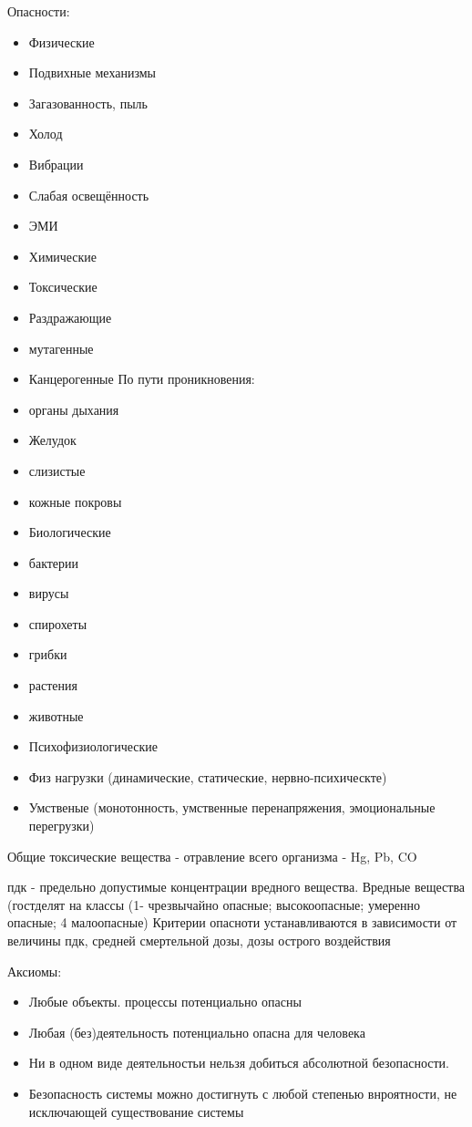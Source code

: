 \documentclass[a4paper,12pt]{report}
\begin{document}
	Опасности:
	\begin{itemize}
	\item	Физические
		\item	Подвихные механизмы
		\item	Загазованность, пыль
		\item	Холод
		\item	Вибрации
		\item	Слабая освещённость 
		\item	ЭМИ
	\item	Химические
		\item	Токсические
		\item	Раздражающие
		\item	мутагенные 
		\item	Канцерогенные
		По пути проникновения: 
		\item	органы дыхания
		\item	Желудок
		\item	слизистые
		\item	кожные покровы
	\item	Биологические
		\item	бактерии
		\item	вирусы
		\item	спирохеты
		\item	грибки
		\item	растения
		\item	животные
	\item	Психофизиологические
		\item	Физ нагрузки (динамические, статические, нервно-психическте)
		\item	Умственые (монотонность, умственные перенапряжения, эмоциональные перегрузки)
	\end{itemize}
	Общие токсические вещества - отравление всего организма - Hg, Pb, CO
	
	пдк - предельно допустимые концентрации вредного вещества.
	Вредные вещества (гостделят на классы (1- чрезвычайно опасные; высокоопасные; умеренно опасные; 4 малоопасные)
	 Критерии опасноти устанавливаются в зависимости от величины пдк, средней смертельной дозы, дозы острого воздействия
	 
	Аксиомы:
	\begin{itemize}
	\item	Любые объекты. процессы потенциально опасны
	\item	Любая (без)деятельность потенциально опасна для человека
	\item	Ни в одном виде деятельностьи нельзя добиться абсолютной безопасности.
	\item	Безопасность системы можно достигнуть с любой степенью внроятности, не исключающей существование системы
	\end{itemize}
	
\end{document}
